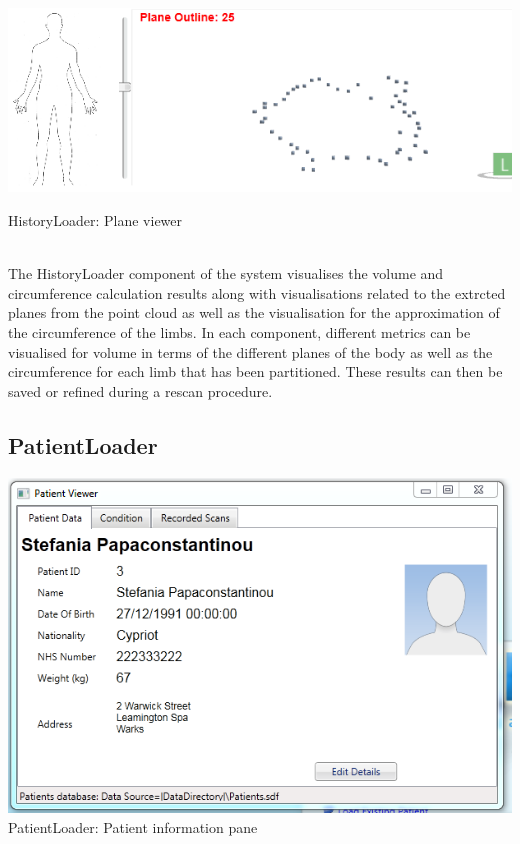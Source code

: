\begin{center}
    \includegraphics[scale=0.75]{zscreenshots/volumevisualisation.png}
    \caption{HistoryLoader: Plane viewer}
\end{center} \\

The HistoryLoader component of the system visualises the volume and circumference calculation results along with visualisations related to the extrcted planes from the point cloud as well as the visualisation for the approximation of the circumference of the limbs. In each component, different metrics can be visualised for volume in terms of the different planes of the body as well as the circumference for each limb that has been partitioned. These results can then be saved or refined during a rescan procedure. \\

\subsection{PatientLoader}

\begin{center}
    \includegraphics[scale=0.5]{zscreenshots/patientdetail.png} \\
    \caption{PatientLoader: Patient information pane}
\end{center} \\

